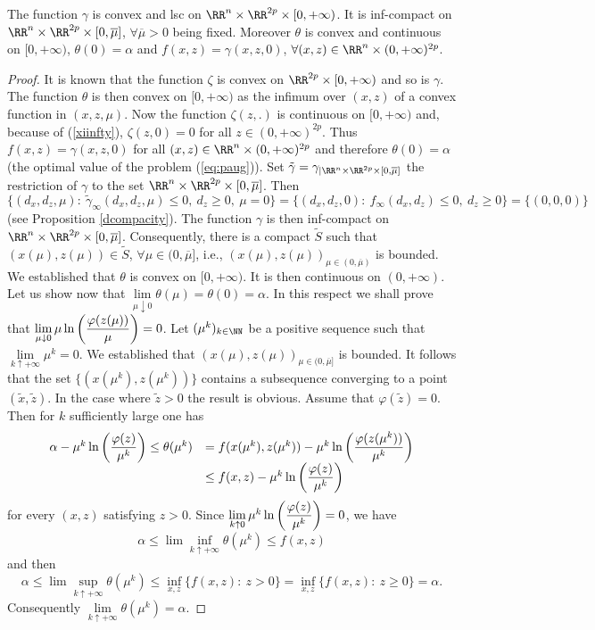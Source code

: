 \begin{proposition}
\label{coercivity}
The function $\gamma$ is convex and lsc on $\RR^n\times\RR^{2p}\times[0,+\infty)$. It is inf-compact on $\RR^n\times\RR^{2p}\times[0,{\overline \mu}]$, $\forall\overline{\mu}>0$ being fixed. Moreover $\theta$ is convex and continuous on $[0,+\infty)$, $\theta(0)=\alpha$ and $f(x,z)=\gamma(x,z,0)$, $\forall (x,z)\in\RR^n\times(0,+\infty)^{2p}$.
\end{proposition}
\begin{proof}
It is known that the function $\zeta$ is convex on $\RR^{2p}\times[0,+\infty)$
and so is $\gamma$. The function $\theta$ is then convex on $[0,+\infty)$ as the
infimum over $(x,z)$ of a convex function in $(x,z,\mu)$. Now the function
$\zeta(z,.)$ is continuous on $[0,+\infty)$ and, because of (\ref{xiinfty}),
$\zeta(z,0)=0$ for all $z\in(0,+\infty)^{2p}$. Thus $f(x,z)=\gamma(x,z,0)$ for
all $(x,z)\in\RR^n\times(0,+\infty)^{2p}$ and therefore $\theta(0)=\alpha$ (the
optimal value of the problem (\ref{eq:paug})). Set
$\tilde{\gamma}=\gamma_{|\RR^n\times\RR^{2p}\times[0,\overline{\mu}]}$ the
restriction of $\gamma$ to the set
$\RR^n\times\RR^{2p}\times[0,\overline{\mu}]$. Then $\{(d_x,d_z,\mu):\
\tilde{\gamma}_\infty(d_x,d_z,\mu)\leq0,\ d_z\geq0,\ \mu=0\}=\{(d_x,d_z,0):\
f_\infty(d_x,d_z)\leq0,\ d_z\geq0\}=\{(0,0,0)\}$ (see Proposition
\ref{dcompacity}). The function $\gamma$ is then inf-compact on
$\RR^n\times\RR^{2p}\times[0,{\overline \mu}]$. Consequently, there is a compact
$\tilde{S}$ such that $(x(\mu),z(\mu))\in\tilde{S}$,
$\forall\mu\in(0,\overline{\mu}]$, i.e.,
$(x(\mu),z(\mu))_{\mu\in(0,\overline{\mu})}$ is bounded. We established that $\theta$ is convex on $[0,+\infty)$. It is then continuous on $(0,+\infty)$. Let us show now that $\lim\limits_{\mu\downarrow 0}\theta(\mu)=\theta(0)=\alpha$. In this respect we shall prove that 
$\lim\limits_{\mu\downarrow0}\mu\ln\left(\displaystyle{\varphi(z(\mu)) \over\mu}\right)= 0$. Let $(\mu^k)_{k\in\NN}$ be a positive sequence such that $\lim\limits_{k\uparrow+\infty}\mu^k=0.$ We established that $(x(\mu),z(\mu))_{\mu\in(0,\overline{\mu}]}$ is bounded. It follows that the set $\{(x(\mu^k),z(\mu^k))\}$ contains a subsequence converging to a point  $(\tilde{x},\tilde{z})$.
In the case where $\tilde{z}>0$ the result is obvious. Assume that $\varphi(\tilde{z})=0$. Then for $k$ sufficiently large one has
$$\begin{array}{ll}\alpha-\mu^k\ln\left(\displaystyle{\varphi(z)\over\mu^k}\right)
\leq \theta(\mu^k)&=f(x(\mu^k),z(\mu^k))-\mu^k\ln\left(\displaystyle{\varphi(z(\mu^k)) \over \mu^k}\right)\cr&
\leq f(x,z)-\mu^k\ln\left(\displaystyle{\varphi(z)\over\mu^k}\right)
\end{array}$$
for every $(x,z)$ satisfying $z>0$. Since $\lim\limits_{k\uparrow 0}\mu^k\ln\left(\displaystyle{\varphi(z)\over\mu^k}\right)=0$, we have
$$\alpha\leq\lim\inf\limits_{k\uparrow+\infty}\theta(\mu^k)\leq f(x,z)$$
and then
$$\alpha\leq\lim\sup\limits_{k\uparrow+\infty}\theta(\mu^k)\leq \inf\limits_{x,z}\{f(x,z):\ z>0\}=\inf\limits_{x,z}\{f(x,z):\ z\geq0\}=\alpha.$$
Consequently $\lim\limits_{k\uparrow+\infty}\theta(\mu^k)=\alpha$.
\end{proof}
\bigskip
\bigskip


